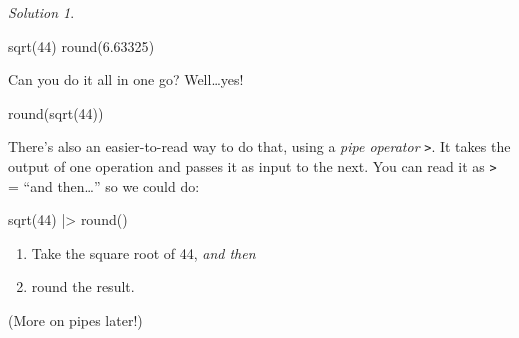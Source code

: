 \documentclass[
  letterpaper,
  DIV=11,
  numbers=noendperiod]{scrreprt}
\newenvironment{Shaded}{\begin{snugshade}}{\end{snugshade}}
\newcommand{\DecValTok}[1]{\textcolor[rgb]{0.68,0.00,0.00}{#1}}
\newcommand{\FloatTok}[1]{\textcolor[rgb]{0.68,0.00,0.00}{#1}}
\newcommand{\FunctionTok}[1]{\textcolor[rgb]{0.28,0.35,0.67}{#1}}
\newcommand{\NormalTok}[1]{\textcolor[rgb]{0.00,0.23,0.31}{#1}}
\newcommand{\SpecialCharTok}[1]{\textcolor[rgb]{0.37,0.37,0.37}{#1}}
\providecommand{\tightlist}{%
  \setlength{\itemsep}{0pt}\setlength{\parskip}{0pt}}\usepackage{longtable,booktabs,array}
\theoremstyle{remark}
\newtheorem*{solution}{Solution}
\begin{document}
\begin{solution}
\leavevmode

\begin{tcolorbox}[enhanced jigsaw, colbacktitle=quarto-callout-tip-color!10!white, opacitybacktitle=0.6, titlerule=0mm, left=2mm, leftrule=.75mm, toptitle=1mm, toprule=.15mm, rightrule=.15mm, title=\textcolor{quarto-callout-tip-color}{\faLightbulb}\hspace{0.5em}{Solution:}, colback=white, arc=.35mm, colframe=quarto-callout-tip-color-frame, bottomrule=.15mm, breakable, bottomtitle=1mm, opacityback=0, coltitle=black]

\begin{Shaded}
\begin{Highlighting}[]
\FunctionTok{sqrt}\NormalTok{(}\DecValTok{44}\NormalTok{)}
\FunctionTok{round}\NormalTok{(}\FloatTok{6.63325}\NormalTok{)}
\end{Highlighting}
\end{Shaded}

Can you do it all in one go? Well\ldots yes!

\begin{Shaded}
\begin{Highlighting}[]
\FunctionTok{round}\NormalTok{(}\FunctionTok{sqrt}\NormalTok{(}\DecValTok{44}\NormalTok{))}
\end{Highlighting}
\end{Shaded}

There's also an easier-to-read way to do that, using a \emph{pipe
operator} \texttt{\textbar{}\textgreater{}}. It takes the output of one
operation and passes it as input to the next. You can read it as
\texttt{\textbar{}\textgreater{}} = ``and then\ldots{}'' so we could do:

\begin{Shaded}
\begin{Highlighting}[]
\FunctionTok{sqrt}\NormalTok{(}\DecValTok{44}\NormalTok{) }\SpecialCharTok{|\textgreater{}}
  \FunctionTok{round}\NormalTok{()}
\end{Highlighting}
\end{Shaded}

\begin{enumerate}
\def\labelenumi{\arabic{enumi}.}
\tightlist
\item
  Take the square root of 44, \emph{and then}
\item
  round the result.
\end{enumerate}

(More on pipes later!)

\end{tcolorbox}

\end{solution}
\end{document}
